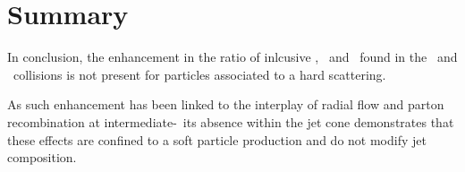 
\section{Summary}

In conclusion, the enhancement in the ratio of inlcusive \lda, \alda\ and \ks\ found in the \pPb\ and \PbPb\ collisions is not present for particles associated to a hard scattering. 


As such enhancement has been linked to the interplay of radial flow and parton recombination at intermediate-\pt\ its absence within the jet cone demonstrates that these effects are confined to a soft particle production and do not modify jet composition. 


